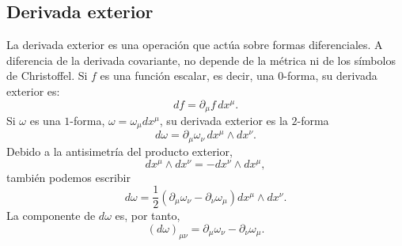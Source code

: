 \documentclass[a4paper,11pt]{book} %
\begin{document}
\subsection*{Derivada exterior}
\noindent
La derivada exterior es una operación que actúa sobre formas diferenciales.
A diferencia de la derivada covariante, no depende de la métrica ni de los
símbolos de Christoffel. 
\medskip\newline
Si \(f\) es una función escalar, es decir, una \(0\)-forma, su derivada exterior es:
\begin{equation}
    df = \partial_\mu f\, dx^\mu.
\end{equation}
\noindent
Si \(\omega\) es una \(1\)-forma, $\omega = \omega_\mu dx^\mu$, su derivada exterior es la \(2\)-forma
\begin{equation}
    d\omega
    =
    \partial_\mu \omega_\nu \, dx^\mu \wedge dx^\nu.
\end{equation}
\noindent
Debido a la antisimetría del producto exterior,
\begin{equation}
    dx^\mu \wedge dx^\nu = - dx^\nu \wedge dx^\mu,
\end{equation}
también podemos escribir
\begin{equation}
    d\omega
    =
    \frac{1}{2}
    \left(
        \partial_\mu \omega_\nu
        -
        \partial_\nu \omega_\mu
    \right)
    dx^\mu \wedge dx^\nu.
\end{equation}
La componente de \(d\omega\) es, por tanto,
\begin{equation}
    (d\omega)_{\mu\nu}
    =
    \partial_\mu \omega_\nu
    -
    \partial_\nu \omega_\mu.
\end{equation}
\end{document}
